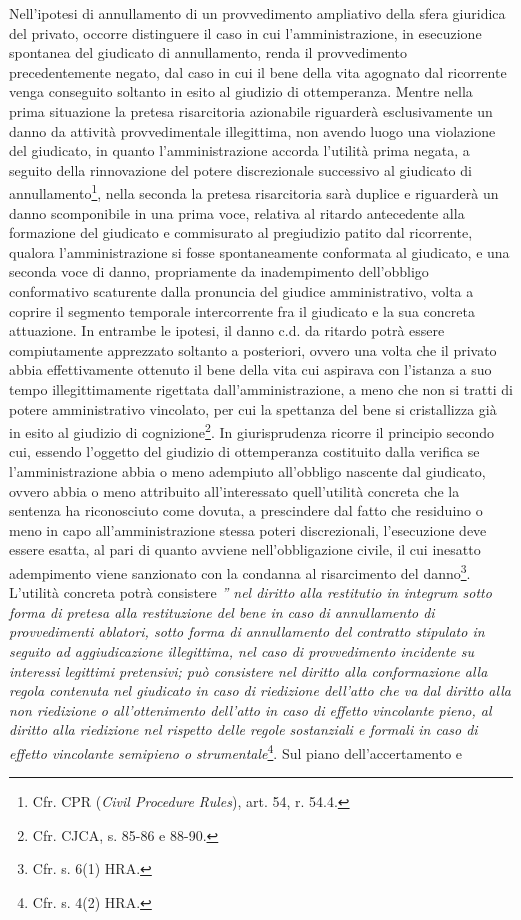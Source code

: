 \documentclass[12pt,it,a4paper,]{report}
\begin{document}
Nell'ipotesi di annullamento di un provvedimento ampliativo della sfera
giuridica del privato, occorre distinguere il caso in cui
l'amministrazione, in esecuzione spontanea del giudicato di
annullamento, renda il provvedimento precedentemente negato, dal caso in
cui il bene della vita agognato dal ricorrente venga conseguito soltanto
in esito al giudizio di ottemperanza. Mentre nella prima situazione la
pretesa risarcitoria azionabile riguarderà esclusivamente un danno da
attività provvedimentale illegittima, non avendo luogo una violazione
del giudicato, in quanto l'amministrazione accorda l'utilità prima
negata, a seguito della rinnovazione del potere discrezionale successivo
al giudicato di annullamento\footnote{Cfr. CPR (\emph{Civil Procedure
  Rules}), art. 54, r. 54.4.}, nella seconda la pretesa risarcitoria
sarà duplice e riguarderà un danno scomponibile in una prima voce,
relativa al ritardo antecedente alla formazione del giudicato e
commisurato al pregiudizio patito dal ricorrente, qualora
l'amministrazione si fosse spontaneamente conformata al giudicato, e una
seconda voce di danno, propriamente da inadempimento dell'obbligo
conformativo scaturente dalla pronuncia del giudice amministrativo,
volta a coprire il segmento temporale intercorrente fra il giudicato e
la sua concreta attuazione. In entrambe le ipotesi, il danno c.d. da
ritardo potrà essere compiutamente apprezzato soltanto a posteriori,
ovvero una volta che il privato abbia effettivamente ottenuto il bene
della vita cui aspirava con l'istanza a suo tempo illegittimamente
rigettata dall'amministrazione, a meno che non si tratti di potere
amministrativo vincolato, per cui la spettanza del bene si cristallizza
già in esito al giudizio di cognizione\footnote{Cfr. CJCA, s. 85-86 e
  88-90.}. In giurisprudenza ricorre il principio secondo cui, essendo
l'oggetto del giudizio di ottemperanza costituito dalla verifica se
l'amministrazione abbia o meno adempiuto all'obbligo nascente dal
giudicato, ovvero abbia o meno attribuito all'interessato quell'utilità
concreta che la sentenza ha riconosciuto come dovuta, a prescindere dal
fatto che residuino o meno in capo all'amministrazione stessa poteri
discrezionali, l'esecuzione deve essere esatta, al pari di quanto
avviene nell'obbligazione civile, il cui inesatto adempimento viene
sanzionato con la condanna al risarcimento del danno\footnote{Cfr. s.
  6(1) HRA.}. L'utilità concreta potrà consistere \emph{'' nel diritto
alla restitutio in integrum sotto forma di pretesa alla restituzione del
bene in caso di annullamento di provvedimenti ablatori, sotto forma di
annullamento del contratto stipulato in seguito ad aggiudicazione
illegittima, nel caso di provvedimento incidente su interessi legittimi
pretensivi; può consistere nel diritto alla conformazione alla regola
contenuta nel giudicato in caso di riedizione dell'atto che va dal
diritto alla non riedizione o all'ottenimento dell'atto in caso di
effetto vincolante pieno, al diritto alla riedizione nel rispetto delle
regole sostanziali e formali in caso di effetto vincolante semipieno o
strumentale}\footnote{Cfr. s. 4(2) HRA.}. Sul piano dell'accertamento e
\end{document}
